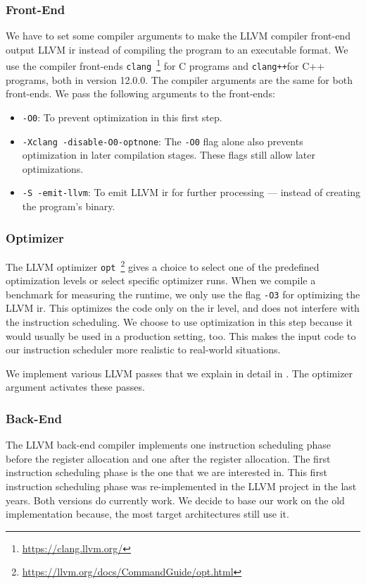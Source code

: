 \subsubsection{Front-End}
We have to set some compiler arguments to make the LLVM compiler front-end output LLVM \ac{ir} instead of compiling the program to an executable format.
We use the compiler front-ends \lstinline{clang}~\footnote{\url{https://clang.llvm.org/}} for C programs and \lstinline{clang++}\footnotemark[1] for C++ programs, both in version 12.0.0.
The compiler arguments are the same for both front-ends.
We pass the following arguments to the front-ends:
\begin{itemize}
    \item \lstinline{-O0}: To prevent optimization in this first step.
    \item \lstinline{-Xclang -disable-O0-optnone}: The \lstinline{-O0} flag alone also prevents optimization in later compilation stages. These flags still allow later optimizations.
    \item \lstinline{-S -emit-llvm}: To emit LLVM \ac{ir} for further processing --- instead of creating the program's binary.
\end{itemize}

\subsubsection{Optimizer}
The LLVM optimizer \lstinline{opt}~\footnote{\url{https://llvm.org/docs/CommandGuide/opt.html}} gives a choice to select one of the predefined optimization levels or select specific optimizer runs.
When we compile a benchmark for measuring the runtime, we only use the flag \lstinline{-O3} for optimizing the LLVM \ac{ir}.
This optimizes the code only on the \ac{ir} level, and does not interfere with the instruction scheduling.
We choose to use optimization in this step because it would usually be used in a production setting, too.
This makes the input code to our instruction scheduler more realistic to real-world situations.

We implement various LLVM passes that we explain in detail in .
The optimizer argument \mbox{} activates these passes.

\subsubsection{Back-End}
The LLVM back-end compiler implements one instruction scheduling phase before the register allocation and one after the register allocation.
The first instruction scheduling phase is the one that we are interested in.
This first instruction scheduling phase was re-implemented in the LLVM project in the last years.
Both versions do currently work.
We decide to base our work on the old implementation because, the most target architectures still use it.

